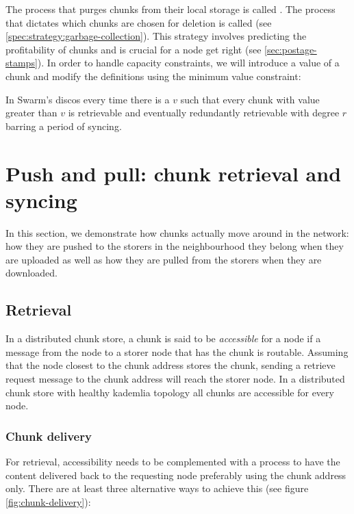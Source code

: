 The process that purges chunks from their local storage is called . The process that dictates which chunks are chosen for deletion is called   (see  \ref{spec:strategy:garbage-collection}). This strategy involves predicting the profitability of chunks and is crucial for a node get right (see \ref{sec:postage-stamps}). In order to handle capacity constraints, we will introduce a value of a chunk and modify the definitions using the minimum value constraint:

In Swarm's discos every time there is a $v$ such that every chunk with value greater than $v$ is retrievable and eventually redundantly retrievable with degree $r$ barring a period of syncing.


\section{Push and pull: chunk retrieval and syncing}\label{sec:push-and-pull}

In this section,  we demonstrate how chunks actually move around in the network: how they are pushed to the storers in the neighbourhood they belong when they are uploaded as well as how they are pulled from the storers when they are downloaded.

\subsection{Retrieval}\label{sec:retrieval}

In a distributed chunk store, a chunk is said to be \emph{accessible} for a node if a message from the node to a storer node that has the chunk is routable. Assuming that the node closest to the chunk address stores the chunk, sending a retrieve request message to the chunk address will reach the storer node. In a distributed chunk store with healthy kademlia topology all chunks are accessible for every node.  

\subsubsection{Chunk delivery}

For retrieval, accessibility needs to be complemented with a process to have the content delivered back to the requesting node preferably using the chunk address only. There are at least three alternative ways to achieve this (see figure \ref{fig:chunk-delivery}):

